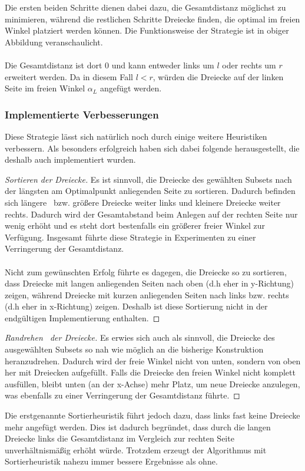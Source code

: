\documentclass[a4paper, notitlepage, 12pt]{scrartcl}
\begin{document}
Die ersten beiden Schritte dienen dabei dazu, die Gesamtdistanz möglichst zu minimieren, während die restlichen Schritte Dreiecke finden, die optimal im freien Winkel platziert werden können. Die Funktionsweise der Strategie ist in obiger Abbildung veranschaulicht. \\ \\
Die Gesamtdistanz ist dort 0 und kann entweder links um $l$ oder rechts um $r$ erweitert werden. Da in diesem Fall $l < r$, würden die Dreiecke auf der linken Seite im freien Winkel $\alpha_L$ angefügt werden.
\subsubsection{Implementierte Verbesserungen}
Diese Strategie lässt sich natürlich noch durch einige weitere Heuristiken verbessern. Als besonders erfolgreich haben sich dabei folgende herausgestellt, die deshalb auch implementiert wurden.
\begin{proof}[Sortieren der Dreiecke]
	Es ist sinnvoll, die Dreiecke des gewählten Subsets nach der längsten am Optimalpunkt anliegenden Seite zu sortieren. Dadurch befinden sich \glqq längere\grqq~ bzw. größere Dreiecke weiter links und kleinere Dreiecke weiter rechts. Dadurch wird der Gesamtabstand beim Anlegen auf der rechten Seite nur wenig erhöht und es steht dort bestenfalls ein größerer freier Winkel zur Verfügung. Insgesamt führte diese Strategie in Experimenten zu einer Verringerung der Gesamtdistanz. \\ \\
	Nicht zum gewünschten Erfolg führte es dagegen, die Dreiecke so zu sortieren, dass Dreiecke mit langen anliegenden Seiten nach oben (d.h eher in y-Richtung) zeigen, während Dreiecke mit kurzen anliegenden Seiten nach links bzw. rechts (d.h eher in x-Richtung) zeigen. Deshalb ist diese Sortierung nicht in der endgültigen Implementierung enthalten.
\end{proof}
\begin{proof}[\glqq Randrehen\grqq~ der Dreiecke]
	Es erwies sich auch als sinnvoll, die Dreiecke des ausgewählten Subsets so nah wie möglich an die bisherige Konstruktion heranzudrehen. Dadurch wird der freie Winkel nicht von unten, sondern von oben her mit Dreiecken aufgefüllt. Falls die Dreiecke den freien Winkel nicht komplett ausfüllen, bleibt unten (an der x-Achse) mehr Platz, um neue Dreiecke anzulegen, was ebenfalls zu einer Verringerung der Gesamtdistanz führte.
\end{proof}
\hspace*{-1em}Die erstgenannte Sortierheuristik führt jedoch dazu, dass links fast keine Dreiecke mehr angefügt werden. Dies ist dadurch begründet, dass durch die langen Dreiecke links die Gesamtdistanz im Vergleich zur rechten Seite unverhältnismäßig erhöht würde. Trotzdem erzeugt der Algorithmus mit Sortierheuristik nahezu immer bessere Ergebnisse als ohne.
\end{document}
